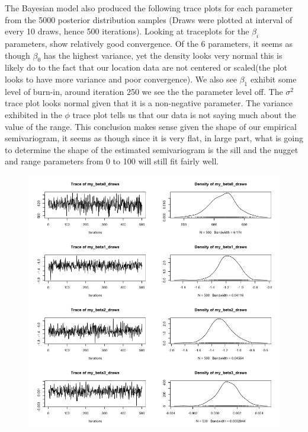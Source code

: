 \documentclass[12pt]{article}
\makeatletter
\theoremstyle{homework}
\newenvironment{exercise}[1]
{\def\@currentlabel{#1}\exercisecore}
{\endexercisecore}
\makeatother
\begin{document}
\begin{exercise}{3}
  The Bayesian model also produced the following trace plots for each parameter from the 5000 posterior distribution samples (Draws were plotted at interval of 
  every 10 draws, hence 500 iterations). Looking at traceplots for the $\beta_i$ parameters, show relatively good convergence. Of the 6 parameters, it seems as though 
  $\beta_0$ has the highest variance, yet the density looks very normal this is likely do to the fact that our location data are not centered or scaled(the plot looks to have more variance and poor convergence). 
  We also see $\beta_1$ exhibit some level of burn-in, around iteration 250 we see the the parameter level off. The $\sigma^2$ trace plot looks normal given that it is a non-negative parameter. The variance exhibited in the 
  $\phi$ trace plot tells us that our data is not saying much about the value of the range. This conclusion makes sense given the shape of our empirical semivariogram, it seems as though since it is very flat, in large part, what is going to determine 
  the shape of the estimated semivariogram is the sill and the nugget and range parameters from 0 to 100 will still fit fairly well. 
  \begin{figure}[H]
    \begin{center}
    \includegraphics[width = \textwidth]{Rplot14.png}
    \end{center}

\end{figure}
\end{exercise}
\end{document}
